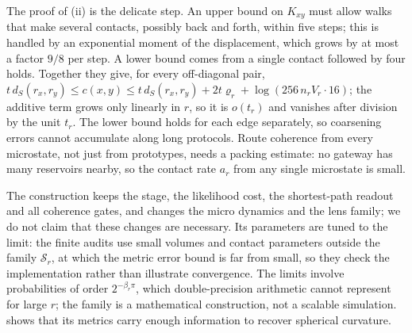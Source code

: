 
The proof of (ii) is the delicate step.
An upper bound on $K_{xy}$ must allow walks that make several contacts, possibly back and forth, within five steps; this is handled by an exponential moment of the displacement, which grows by at most a factor $9/8$ per step.
A lower bound comes from a single contact followed by four holds.
Together they give, for every off-diagonal pair, $t\,d_S(r_x,r_y)\le c(x,y)\le t\,d_S(r_x,r_y)+2t\varrho_r+\log(256\,n_rV_r\cdot16)$; the additive term grows only linearly in $r$, so it is $o(t_r)$ and vanishes after division by the unit $t_r$. The lower bound holds for each edge separately, so coarsening errors cannot accumulate along long protocols.
Route coherence from every microstate, not just from prototypes, needs a packing estimate: no gateway has many reservoirs nearby, so the contact rate $a_r$ from any single microstate is small.

The construction keeps the stage, the likelihood cost, the shortest-path readout and all coherence gates, and changes the micro dynamics and the lens family; we do not claim that these changes are necessary.
Its parameters are tuned to the limit: the finite audits use small volumes and contact parameters outside the family $\mathcal S_r$, at which the metric error bound is far from small, so they check the implementation rather than illustrate convergence.
The limits involve probabilities of order $2^{-\beta_r\pi}$, which double-precision arithmetic cannot represent for large $r$; the family is a mathematical construction, not a scalable simulation.
 shows that its metrics carry enough information to recover spherical curvature.
